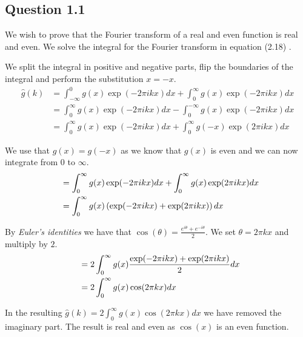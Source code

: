 \documentclass[a4paper, 10pt, final]{article}
\title{\mytitle}
\subtitle{\mysubtitle}
\author{\myauthor{} - \mymail}
\date{\mydate}
\begin{document}
\maketitle

\subsection*{Question 1.1}
We wish to prove that the Fourier transform of a real and even function
is real and even. We solve the integral for the Fourier transform in
equation (2.18) \citet[p. 44]{jahne-digital}.

We split the integral in positive and negative parts, flip the
boundaries of the integral and perform the substitution $x = -x$.
\begin{align*}
    \hat{g}(k) & = \int_{-\infty}^{0}{g(x)\exp(-2\pi ikx)dx} + \int_{0}^{\infty}{g(x)\exp(-2\pi ikx)dx}\\
               & = \int_{0}^{\infty}{g(x)\exp(-2\pi ikx)dx} - \int_{0}^{-\infty}{g(x)\exp(-2\pi ikx)dx}\\
               & = \int_{0}^{\infty}{g(x)\exp(-2\pi ikx)dx} + \int_{0}^{\infty}{g(-x)\exp(2\pi ikx)dx}
\end{align*}

We use that $g(x) = g(-x)$ as we know that $g(x)$ is even and we can now
integrate from $0$ to $\infty$.
\begin{align*}
    \hspace{0.5em} &= \int_{0}^{\infty}{g(x)\exp(-2\pi ikx)dx} + \int_{0}^{\infty}{g(x)\exp(2\pi ikx)dx}\\
               & = \int_{0}^{\infty}{g(x)\left(\exp(-2\pi ikx) + \exp(2\pi ikx)\right)dx}
\end{align*}

By \emph{Euler's identities} we have that $\cos(\theta) =
\frac{e^{i\theta} + e^{-i\theta}}{2}$. We set $\theta = 2\pi kx$ and
multiply by $2$.
\begin{align*}
    \hspace{0.5em} & = 2 \int_{0}^{\infty}{g(x)\frac{\exp(-2\pi ikx) + \exp(2\pi ikx)}{2}dx}\\
               & = 2 \int_{0}^{\infty}{g(x)\cos(2\pi kx)dx}
\end{align*}

In the resulting $\hat{g}(k) = 2 \int_{0}^{\infty}{g(x)\cos(2\pi kx)dx}$
we have removed the imaginary part. The result is real and even as
$\cos(x)$ is an even function.
\end{document}
